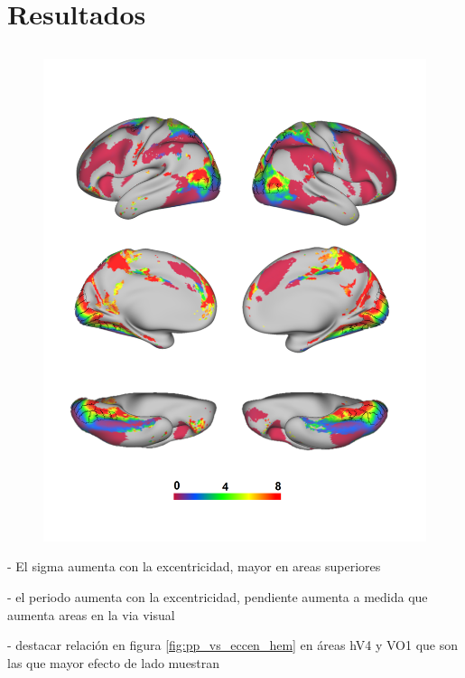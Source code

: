 \chapter{Resultados}\label{chapter:results}

\section{}


\begin{figure}
	\centering		
	\includegraphics[scale=0.3]{Graphics/brain_eccen}
\end{figure}

- El sigma aumenta con la excentricidad, mayor en areas superiores

- el periodo aumenta con la excentricidad, pendiente aumenta a medida que aumenta areas en la via visual

- destacar relaci\'on en figura \ref{fig:pp_vs_eccen_hem} en \'areas hV4 y VO1 que son las que mayor efecto de lado muestran

